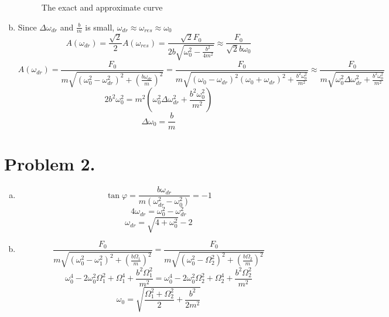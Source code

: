 \documentclass{article}
\begin{document}
\begin{enumerate}[(a)]
\begin{figure}[h!]
		\caption{The exact and approximate curve}
		\label{figure}
	\end{figure}
	\item
	Since $\Delta\omega_{dr}$ and $\frac{b}{m}$ is small, $\omega_{dr}\approx\omega_{res}\approx\omega_0$
	$$A(\omega_{dr})=\frac{\sqrt{2}}{2}A(\omega_{res})
	=\frac{\sqrt{2}F_0}{2b\sqrt{\omega_0^2-\frac{b^2}{4m^2}}}
	\approx\frac{F_0}{\sqrt{2}b\omega_0}$$
	$$A(\omega_{dr})=\frac{F_0}{m\sqrt{(\omega_0^2-\omega_{dr}^2)^2+\left(\frac{b\omega_{dr}}{m}\right)^2}}
	=\frac{F_0}{m\sqrt{(\omega_0-\omega_{dr})^2(\omega_0+\omega_{dr})^2+\frac{b^2\omega_0^2}{m^2}}}
	\approx\frac{F_0}{m\sqrt{\omega_0^2\Delta\omega_{dr}^2+\frac{b^2\omega_0^2}{m^2}}}$$
	$$2b^2\omega_0^2
	=m^2\left(\omega_0^2\Delta\omega_{dr}^2+\frac{b^2\omega_0^2}{m^2}\right)$$
	$$\Delta\omega_0=\frac{b}{m}$$
	\end{enumerate}		

\section*{Problem 2.}
\begin{enumerate}[(a)]
	\item
	$$\tan\varphi=\frac{b\omega_{dr}}{m(\omega_{dr}^2-\omega_0^2)}=-1$$
	$$4\omega_{dr}=\omega_0^2-\omega_{dr}^2$$
	$$\omega_{dr}=\sqrt{4+\omega_0^2}-2$$
	\item
	$$\frac{F_0}{m\sqrt{(\omega_0^2-\omega_1^2)^2+\left(\frac{b\Omega_1}{m}\right)^2}}
	=\frac{F_0}{m\sqrt{(\omega_0^2-\Omega_2^2)^2+\left(\frac{b\Omega_2}{m}\right)^2}}$$
	$$\omega_0^4-2\omega_0^2\Omega_1^2+\Omega_1^4+\frac{b^2\Omega_1^2}{m^2}
	=\omega_0^4-2\omega_0^2\Omega_2^2+\Omega_2^4+\frac{b^2\Omega_2^2}{m^2}$$
	$$\omega_0=\sqrt{\frac{\Omega_1^2+\Omega_2^2}{2}+\frac{b^2}{2m^2}}$$
\end{enumerate}
\end{document}
